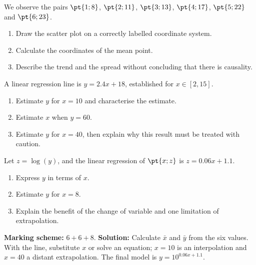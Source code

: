 \begin{exercise}
We observe the pairs $\pt{1;8}$, $\pt{2;11}$, $\pt{3;13}$, $\pt{4;17}$, $\pt{5;22}$ and $\pt{6;23}$.
\begin{enumerate}
\item Draw the scatter plot on a correctly labelled coordinate system.
\item Calculate the coordinates of the mean point.
\item Describe the trend and the spread without concluding that there is causality.
\end{enumerate}
\end{exercise}
\begin{exercise}
A linear regression line is $y=\num{2,4}x+18$, established for $x\in[2,15]$.
\begin{enumerate}
\item Estimate $y$ for $x=10$ and characterise the estimate.
\item Estimate $x$ when $y=60$.
\item Estimate $y$ for $x=40$, then explain why this result must be treated with caution.
\end{enumerate}
\end{exercise}
\begin{exercise}
Let $z=\log(y)$, and the linear regression of $\pt{x;z}$ is $z=\num{0,06}x+\num{1,1}$.
\begin{enumerate}
\item Express $y$ in terms of $x$.
\item Estimate $y$ for $x=8$.
\item Explain the benefit of the change of variable and one limitation of extrapolation.
\end{enumerate}
\end{exercise}
\begin{solution}\textbf{Marking scheme:} $6+6+8$. \textbf{Solution:} Calculate $\bar x$ and $\bar y$ from the six values. With the line, substitute $x$ or solve an equation; $x=10$ is an interpolation and $x=40$ a distant extrapolation. The final model is $y=10^{\num{0,06}x+\num{1,1}}$.\end{solution}

